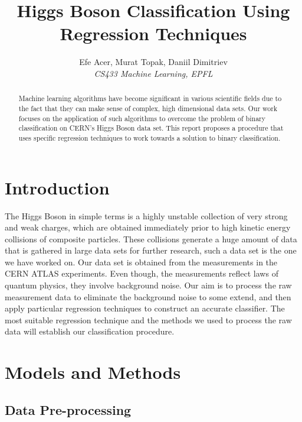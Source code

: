 \documentclass[10pt,conference,compsocconf]{IEEEtran}
\begin{document}
\title{Higgs Boson Classification Using Regression Techniques}

\author{
  Efe Acer, Murat Topak, Daniil Dimitriev\\
  \textit{CS433 Machine Learning, EPFL}
}

\maketitle

\begin{abstract}
  Machine learning algorithms have become significant in various scientific fields due to the fact that they can make sense of complex, high dimensional data sets. Our work focuses on the application of such algorithms to overcome the problem of binary classification on CERN's Higgs Boson data set. This report proposes a procedure that uses specific regression techniques to work towards a solution to binary classification.
\end{abstract}

\section{Introduction}

The Higgs Boson in simple terms is a highly unstable collection of very strong and weak charges, which are obtained immediately prior to high kinetic energy collisions of composite particles. These collisions generate a huge amount of data that is gathered in large data sets for further research, such a data set is the one we have worked on. Our data set is obtained from the measurements in the CERN ATLAS experiments. Even though, the measurements reflect laws of quantum physics, they involve background noise. Our aim is to process the raw measurement data to eliminate the background noise to some extend, and then apply particular regression techniques to construct an accurate classifier. The most suitable regression technique and the methods we used to process the raw data will establish our classification procedure.

\section{Models and Methods}
\label{sec:structure-paper}

\subsection{Data Pre-processing}
\end{document}
